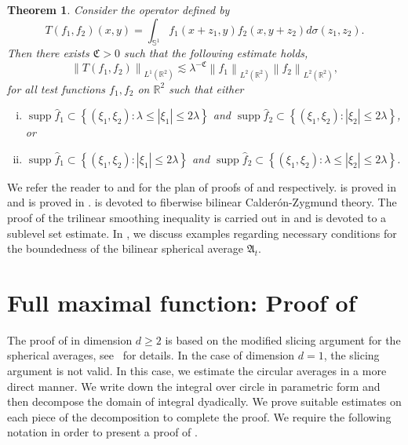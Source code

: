 \documentclass[a4paper,reqno]{amsart}
\newtheorem{theorem}{Theorem}[section]
\theoremstyle{definition}
\theoremstyle{remark}
\numberwithin{equation}{section}
\newcommand{\R}{{\mathbb {R}}}
\newcommand{\Sp}{{\mathbb S}}
\begin{document}
	\begin{theorem}\label{Trilinearsmoothing}
		Consider the operator defined by
		\[
		T\left(f_1, f_2\right)(x, y)=\int_{\Sp^1} f_1\left(x+z_1, y\right) f_2\left(x, y+z_2\right) d \sigma\left(z_1, z_2\right).
		\]
		Then there exists $\mathfrak{C}>0$ such that the following estimate holds,
		\[
		\left\|T\left(f_1, f_2\right)\right\|_{L^{1}\left(\mathbb{R}^2\right)} \lesssim \lambda^{-\mathfrak{C}}\left\|f_1\right\|_{L^2\left(\R^2\right)}\left\|f_2\right\|_{L^2\left(\R^2\right)},
		\]
		\sloppy for all test functions $f_1,f_2$ on $\R^2$ such that either
		\begin{enumerate}[i)]
			\item $\operatorname{supp} \hat{f}_1 \subset\left\{\left(\xi_1, \xi_2\right): \lambda \leq\left|\xi_1\right| \leq 2 \lambda\right\}$ and $\operatorname{supp} \hat{f}_2 \subset\left\{\left(\xi_1, \xi_2\right):\left|\xi_2\right| \leq 2 \lambda\right\}$, or
			\item $\operatorname{supp} \hat{f}_1 \subset\left\{\left(\xi_1, \xi_2\right): \left|\xi_1\right| \leq 2 \lambda\right\}$ and $\operatorname{supp} \hat{f}_2 \subset\left\{\left(\xi_1, \xi_2\right):\lambda\leq\left|\xi_2\right| \leq 2 \lambda\right\}$.
		\end{enumerate}
	\end{theorem}
	We refer the reader to  and  for the plan of proofs of  and  respectively.  is proved in  and  is proved in .  is devoted to fiberwise bilinear Calder\'on-Zygmund theory. The proof of the trilinear smoothing inequality  is carried out in  and  is devoted to a sublevel set estimate. In , we discuss examples regarding necessary conditions for the boundedness of the bilinear spherical average $\mathfrak{A}_t$.
	\section{Full maximal function: Proof of }\label{sec:prooffull} The proof of  in dimension $d\geq 2$ is based on the modified slicing argument for the spherical averages, see~\cite{BCSS1, JeongLee} for details. In the case of dimension $d=1$, the slicing argument is not valid. In this case, we estimate the circular averages in a more direct manner. We write down the integral over circle in parametric form and then decompose the domain of integral dyadically. We prove suitable estimates on each piece of the decomposition to complete the proof. We require the following notation in order to present a proof of . 
	
\end{document}

